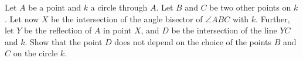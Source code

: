 Let $A$ be a point and $k$ a circle through $A$.
Let $B$ and $C$ be two other points on $k$.
Let now $X$ be the intersection of the angle bisector of $\angle ABC$ with $k$.
Further, let $Y$ be the reflection of $A$ in point $X$, and $D$ be the intersection of the line $YC$ and $k$.
Show that the point $D$ does not depend on the choice of the points $B$ and $C$ on the circle $k$.
